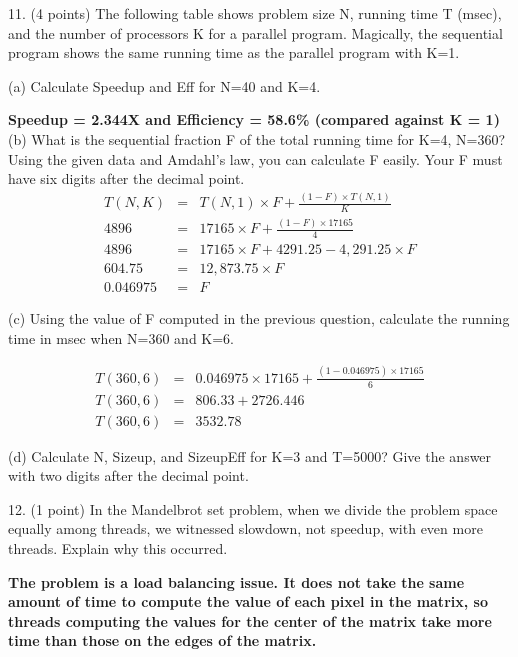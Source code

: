 \documentclass[11pt]{article}
\begin{document}
11. (4 points) The following table shows problem size N, running time T (msec), and the number of processors K for a parallel program. Magically, the sequential program shows the same running time as the parallel program with K=1.

(a) Calculate Speedup and Eff for N=40 and K=4.

{\bf Speedup = 2.344X and Efficiency = 58.6\% (compared against K = 1)} \\

(b) What is the sequential fraction F of the total running time for K=4, N=360? Using the given data and Amdahl's law, you can calculate F easily. Your F must have six digits after the decimal point.
\begin{displaymath}
\begin{array}{rcll}
T(N, K) &=& T(N, 1) \times F + \frac{(1 - F) \times T(N, 1)}{K} \\
4896 &=& 17165 \times F + \frac{(1 - F) \times 17165}{4} \\
4896 &=& 17165 \times F + 4291.25 - 4,291.25 \times F \\
604.75 &=& 12,873.75 \times F \\
0.046975 &=& F

\end{array}
\end{displaymath}

(c) Using the value of F computed in the previous question, calculate the running time in msec when N=360 and K=6.

\begin{displaymath}
\begin{array}{rcll}
T(360, 6) &=& 0.046975 \times17165 + \frac{(1 - 0.046975) \times 17165}{6} \\
T(360, 6) &=& 806.33 + 2726.446 \\
T(360, 6) &=& 3532.78

\end{array}
\end{displaymath}

(d) Calculate N, Sizeup, and SizeupEff for K=3 and T=5000? Give the answer with two digits after the decimal point.

12. (1 point) In the Mandelbrot set problem, when we divide the problem space equally among threads, we witnessed slowdown, not speedup, with even more threads. Explain why this occurred.

{\bf The problem is a load balancing issue.  It does not take the same amount of time to compute the value of each pixel in the matrix, so threads computing the values for the center of the matrix take more time than those on the edges of the matrix.}\\
\end{document}
